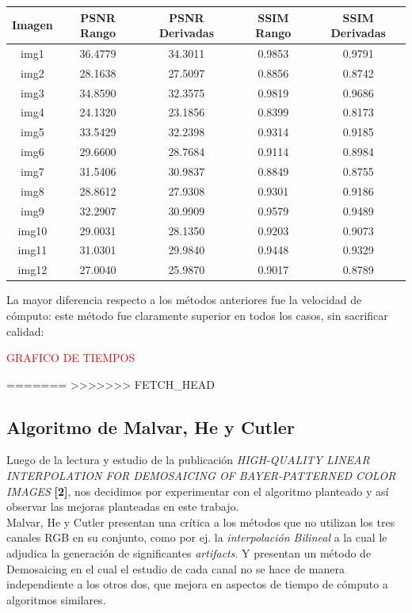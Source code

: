 \documentclass[a4paper]{article}
\begin{document}
\begin{center}
\begin{tabular}{  | c || c | c | c | c | }
 \hline
 Imagen & PSNR Rango & PSNR Derivadas & SSIM Rango & SSIM Derivadas\\
\hline
\hline
 img1 & 36.4779 & 34.3011 & 0.9853 & 0.9791\\
 \hline
 img2 & 28.1638 & 27.5097 & 0.8856 & 0.8742\\
 \hline  
  img3 & 34.8590 & 32.3575 & 0.9819 & 0.9686\\
 \hline  
  img4 & 24.1320 & 23.1856 & 0.8399 & 0.8173\\
 \hline  
  img5 & 33.5429 & 32.2398 & 0.9314 & 0.9185\\
 \hline  
  img6 & 29.6600 & 28.7684 & 0.9114 & 0.8984\\
 \hline  
  img7 & 31.5406 & 30.9837 & 0.8849 & 0.8755\\
 \hline  
  img8 & 28.8612 & 27.9308 & 0.9301 & 0.9186\\
 \hline  
  img9 & 32.2907 & 30.9909 & 0.9579 & 0.9489\\
 \hline  
  img10 & 29.0031 & 28.1350 & 0.9203 & 0.9073\\
 \hline  
  img11 & 31.0301 & 29.9840 & 0.9448 & 0.9329\\
 \hline  
  img12 & 27.0040 & 25.9870 & 0.9017 & 0.8789\\
 \hline  
\end{tabular}
\end{center}

La mayor diferencia respecto a los métodos anteriores fue la velocidad de cómputo: este método fue claramente superior en todos los casos, sin sacrificar calidad:

\textcolor{red}{GRAFICO DE TIEMPOS\\}

=======
>>>>>>> FETCH_HEAD
\newpage
\subsection{Algoritmo de Malvar, He y Cutler}

Luego de la lectura y estudio de la publicaci\'on \textit{HIGH-QUALITY LINEAR INTERPOLATION
FOR DEMOSAICING OF BAYER-PATTERNED COLOR IMAGES} \textbf{[2]}, nos decidimos por experimentar con el algoritmo planteado y as\'i observar las mejoras planteadas en este trabajo.\\

Malvar, He y Cutler presentan una cr\'itica a los m\'etodos que no utilizan los tres canales RGB en su conjunto, como por ej. la \emph{interpolaci\'on Bilineal} a la cual le adjudica la generaci\'on de significantes \textit{artifacts}. Y presentan un m\'etodo de Demosaicing en el cual el estudio de cada canal no se hace de manera independiente a los otros dos, que mejora en aspectos de tiempo de c\'omputo a algoritmos similares.\\
\end{document}
